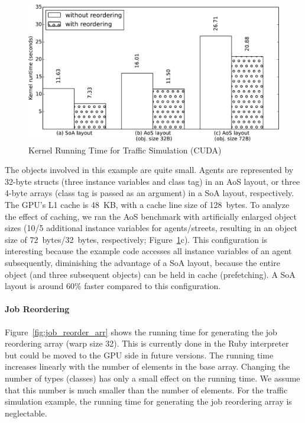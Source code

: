\documentclass[preprint]{sigplanconf}
\begin{document}
\begin{figure}[!htp]
    \includegraphics[width=\columnwidth]{bench_1.pdf}
    \centering
    \caption{Kernel Running Time for Traffic Simulation (CUDA)}
    \label{fig:bench_kernel}
\end{figure}

The objects involved in this example are quite small. Agents are represented by 32-byte structs (three instance variables and class tag) in an AoS layout, or three 4-byte arrays (class tag is passed as an argument) in a SoA layout, respectively. The GPU's L1 cache is 48~KB, with a cache line size of 128~bytes. To analyze the effect of caching, we ran the AoS benchmark with artificially enlarged object sizes (10/5 additional instance variables for agents/streets, resulting in an object size of 72~bytes/32~bytes, respectively; Figure~\ref{fig:bench_kernel}c). This configuration is interesting because the example code accesses all instance variables of an agent subsequently, diminishing the advantage of a SoA layout, because the entire object (and three subsequent objects) can be held in cache (prefetching). A SoA layout is around 60\% faster compared to this configuration.

\paragraph{Job Reordering}
Figure~\ref{fig:job_reorder_arr} shows the running time for generating the job reordering array (warp size 32). This is currently done in the Ruby interpreter but could be moved to the GPU side in future versions. The running time increases linearly with the number of elements in the base array. Changing the number of types (classes) has only a small effect on the running time. We assume that this number is much smaller than the number of elements. For the traffic simulation example, the running time for generating the job reordering array is neglectable.
\end{document}
